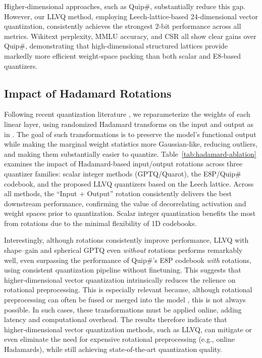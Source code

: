 \documentclass{article}
\theoremstyle{plain}
\theoremstyle{definition}
\theoremstyle{remark}
\begin{document}
Higher‑dimensional approaches, such as Quip\#, substantially reduce this gap. However, our LLVQ method, employing Leech‑lattice‑based 24‑dimensional vector quantization, consistently achieves the strongest 2‑bit performance across all metrics. Wikitext perplexity, MMLU accuracy, and CSR all show clear gains over Quip\#, demonstrating that high‑dimensional structured lattices provide markedly more efficient weight‑space packing than both scalar and E8‑based quantizers.
 

\subsection{Impact of Hadamard Rotations}

Following recent quantization literature \citep{ashkboos2024quarot, chee2023quip}, we reparameterize the weights of each linear layer, using randomized Hadamard transforms on the input and output as in \citep{tseng2024quip}. The goal of such transformations is to preserve the model’s functional output while making the marginal weight statistics more Gaussian‑like, reducing outliers, and making them substantially easier to quantize. Table~\ref{tab:hadamard-ablation} examines the impact of Hadamard-based input/output rotations across three quantizer families: scalar integer methods (GPTQ/Quarot), the E8P/Quip\# codebook, and the proposed LLVQ quantizers based on the Leech lattice. Across all methods, the “Input + Output” rotation consistently delivers the best downstream performance, confirming the value of decorrelating activation and weight spaces prior to quantization. Scalar integer quantization benefits the most from rotations due to the minimal flexibility of 1D codebooks.

Interestingly, although rotations consistently improve performance, LLVQ with shape–gain and spherical GPTQ even \textit{without} rotations performs remarkably well, even surpassing the performance of Quip\#'s E8P codebook \textit{with} rotations, using consistent quantization pipeline without finetuning. This suggests that higher‑dimensional vector quantization intrinsically reduces the relience on rotational preprocessing. This is especially relevant because, although rotational preprocessing can often be fused or merged into the model \citep{ashkboos2024quarot,van2025fptquant}, this is not always possible. In such cases, these transformations must be applied online, adding latency and computational overhead. The results therefore indicate that higher‑dimensional vector quantization methods, such as LLVQ, can mitigate or even eliminate the need for expensive rotational preprocessing (e.g., online Hadamards), while still achieving state‑of‑the‑art quantization quality.
\end{document}
